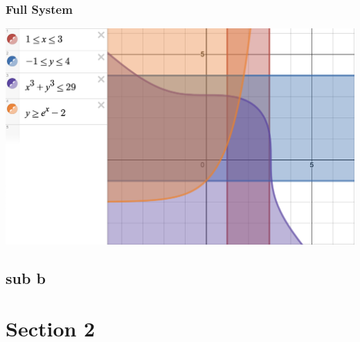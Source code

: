 \documentclass{beamer}
\begin{document}
\begin{frame}
\frametitle{Full System}
\includegraphics[width=\textwidth,height=\textheight,keepaspectratio]{full_system.png}
\end{frame}

\subsection{sub b}

\section{Section 2}
\end{document}
